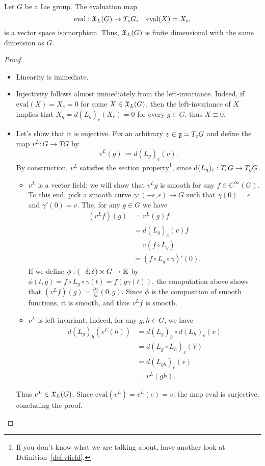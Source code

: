\begin{theorem}
  Let $G$ be a Lie group. The evaluation map 
  \begin{equation}
    \mathrm{eval}:\mathfrak{X}_L(G)\to T_eG, \quad
    \mathrm{eval}(X) = X_e,
  \end{equation}
  is a vector space isomorphism.
  Thus, $\mathfrak{X}_L(G)$ is finite dimensional with the same dimension as $G$.
\end{theorem}
\begin{proof}
  \begin{itemize}
    \item Linearity is immediate.
    \item Injectivity follows almost immediately from the left-invariance. Indeed, if $\mathrm{eval}(X) = X_e = 0$ for some $X\in\mathfrak{X}_L(G)$, then the left-invariance of $X$ implies that $X_g = d(L_g)_e(X_e) = 0$ for every $g\in G$, thus $X\equiv0$.
    \item Let's show that it is sujective. Fix an arbitrary $v\in \mathfrak{g} = T_eG$ and define the map $v^L:G\to TG$ by
    \begin{equation}
      v^L(g) := d(L_g)_e(v).
    \end{equation}
    By construction, $v^L$ satisfies the section property\footnote{If you don't know what we are talking about, have another look at Definition~\ref{def:vfield}.}, since $\operatorname{d}(L_g)_e:T_eG\to T_gG$.
    \begin{itemize}
      \item $v^L$ is a vector field: we will show that $v^L g$ is smooth for any $f\in C^\infty(G)$.
      To this end, pick a smooth curve $\gamma:(-\epsilon,\epsilon)\to G$ such that $\gamma(0)=e$ and $\gamma'(0) = v$. The, for any $g\in G$ we have
      \begin{align}
        (v^L f)(g) &= v^L(g) f \\
        &= d(L_g)_e(v) f\\
        &= v(f\circ L_g) \\
        &= (f\circ L_g\circ \gamma)'(0).
      \end{align}
      If we define $\phi:(-\delta, \delta)\times G \to \mathbb{R}$ by $\phi(t,g) = f\circ L_g\circ \gamma(t) = f(g\gamma(t))$, the computation above shows that $(v^Lf)(g) = \frac{\partial \phi}{\partial t}(0, g)$.
      Since $\phi$ is the composition of smooth functions, it is smooth, and thus $v^L f$ is smooth.
      \item $v^L$ is left-invariant. 
      Indeed, for any $g,h\in G$, we have
      \begin{align}
        d(L_g)_h(v^L(h)) &= d(L_g)_h\circ d(L_h)_e(v)\\ 
        &= d(L_g\circ L_h)_e(V)\\
        &= d(L_{gh})_e(v)\\
        &= v^L(gh).
      \end{align}
    \end{itemize}
    Thus $v^L\in\mathfrak{X}_L(G)$.
    Since $\mathrm{eval}(v^L) = v^L(e) = v$, the map $\mathrm{eval}$ is surjective, concluding the proof.
  \end{itemize}
\end{proof}

